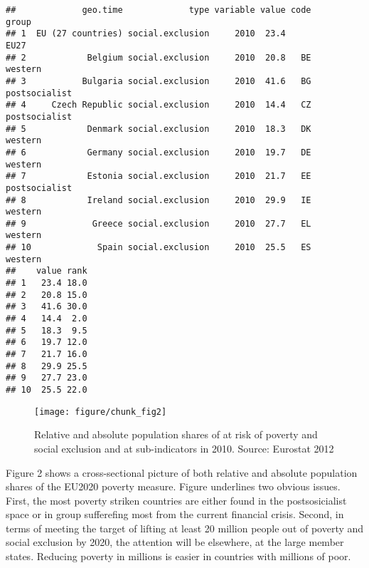\documentclass[11pt, a4paper]{article}\usepackage{graphicx, color}
\makeatletter
\def\maxwidth{ %
  \ifdim\Gin@nat@width>\linewidth
    \linewidth
  \else
    \Gin@nat@width
  \fi
}
\newenvironment{kframe}{%
 \def\at@end@of@kframe{}%
 \ifinner\ifhmode%
  \def\at@end@of@kframe{\end{minipage}}%
  \begin{minipage}{\columnwidth}%
 \fi\fi%
 \def\FrameCommand##1{\hskip\@totalleftmargin \hskip-\fboxsep
 \colorbox{shadecolor}{##1}\hskip-\fboxsep
     \hskip-\linewidth \hskip-\@totalleftmargin \hskip\columnwidth}%
 \MakeFramed {\advance\hsize-\width
   \@totalleftmargin\z@ \linewidth\hsize
   \@setminipage}}%
 {\par\unskip\endMakeFramed%
 \at@end@of@kframe}
\newenvironment{knitrout}{}{} %
\makeatother
\begin{document}
\begin{knitrout}
\color{fgcolor}\begin{kframe}
\begin{verbatim}
##             geo.time             type variable value code         group
## 1  EU (27 countries) social.exclusion     2010  23.4               EU27
## 2            Belgium social.exclusion     2010  20.8   BE       western
## 3           Bulgaria social.exclusion     2010  41.6   BG postsocialist
## 4     Czech Republic social.exclusion     2010  14.4   CZ postsocialist
## 5            Denmark social.exclusion     2010  18.3   DK       western
## 6            Germany social.exclusion     2010  19.7   DE       western
## 7            Estonia social.exclusion     2010  21.7   EE postsocialist
## 8            Ireland social.exclusion     2010  29.9   IE       western
## 9             Greece social.exclusion     2010  27.7   EL       western
## 10             Spain social.exclusion     2010  25.5   ES       western
##    value rank
## 1   23.4 18.0
## 2   20.8 15.0
## 3   41.6 30.0
## 4   14.4  2.0
## 5   18.3  9.5
## 6   19.7 12.0
## 7   21.7 16.0
## 8   29.9 25.5
## 9   27.7 23.0
## 10  25.5 22.0
\end{verbatim}
\end{kframe}\begin{figure}[H]
\texttt{[image: figure/chunk\_fig2]} \caption[Relative and absolute population shares of at risk of poverty and social exclusion and at sub-indicators in 2010]{Relative and absolute population shares of at risk of poverty and social exclusion and at sub-indicators in 2010. Source: Eurostat 2012\label{fig:chunk_fig2}}
\end{figure}

\end{knitrout}



Figure 2 shows a cross-sectional picture of both relative and absolute population shares of the EU2020 poverty measure. Figure underlines two obvious issues. First, the most poverty striken countries are either found in the postsosicialist space or in group sufferefing most from the current financial crisis. Second, in terms of meeting the target of lifting at least 20 million people out of poverty and social exclusion by 2020, the attention will be elsewhere, at the large member states. Reducing poverty in millions is easier in countries with millions of poor.
\end{document}
